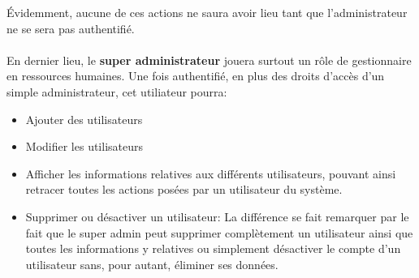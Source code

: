 \par 
Évidemment, aucune de ces actions ne saura avoir lieu tant que l'administrateur ne se sera pas authentifié.
\paragraph{}
En dernier lieu, le \textbf{super administrateur} jouera surtout un rôle de gestionnaire en ressources 
humaines. Une fois authentifié, en plus des droits d'accès d'un simple administrateur, 
cet utiliateur pourra:
\begin{itemize}
    \item Ajouter des utilisateurs
    \item Modifier les utilisateurs
    \item Afficher les informations relatives aux différents utilisateurs, pouvant 
    ainsi retracer toutes les actions posées par un utilisateur du système.
    \item Supprimer ou désactiver un utilisateur: La différence se fait remarquer 
    par le fait que le super admin peut supprimer complètement un utilisateur ainsi 
    que toutes les informations y relatives ou simplement désactiver le compte d'un 
    utilisateur sans, pour autant, éliminer ses données.
\end{itemize}
